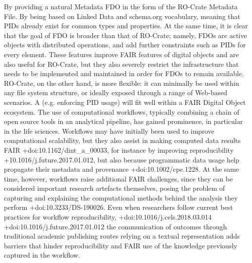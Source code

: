 By providing a natural Metadata FDO in the form of the RO-Crate Metadata File.\markdownRendererOlItemEnd 
{}By being based on Linked Data and schema.org vocabulary, meaning that PIDs already exist for common types and properties.\markdownRendererOlItemEnd 
\markdownRendererOlEndTight \markdownRendererInterblockSeparator
{}At the same time, it is clear that the goal of FDO is broader than that of RO-Crate; namely, FDOs are active objects with distributed operations, and add further constraints such as PIDs for every element. These features improve FAIR features of digital objects and are also useful for RO-Crate, but they also severely restrict the infrastructure that needs to be implemented and maintained in order for FDOs to remain available. RO-Crate, on the other hand, is more flexible: it can minimally be used within any file system structure, or ideally exposed through a range of Web-based scenarios. A  (e.g. enforcing PID usage) will fit well within a FAIR Digital Object ecosystem.\markdownRendererInterblockSeparator
{}\markdownRendererInterblockSeparator
{}The use of computational workflows, typically combining a chain of open source tools in an analytical pipeline, has gained prominence, in particular in the life sciences. Workflows may have initially been used to improve computational scalability, but they also assist in making computed data results FAIR +{}{}{doi:10.1162/dint_a_00033}, for instance by improving reproducibility +{}{}{10.1016/j.future.2017.01.012}, but also because programmatic data usage help propagate their metadata and provenance +{}{}{doi:10.1002/cpe.1228}. At the same time, however, workflows raise additional FAIR challenges, since they can be considered important research artefacts themselves, posing the problem of capturing and explaining the computational methods behind the analysis they perform +{}{}{doi:10.3233/DS-190026}.\markdownRendererInterblockSeparator
{}Even when researchers follow current best practices for workflow reproducibility, +{}{}{doi:10.1016/j.cels.2018.03.014} +{}{}{doi:10.1016/j.future.2017.01.012} the communication of outcomes through traditional academic publishing routes relying on a textual representation adds barriers that hinder reproducibility and FAIR use of the knowledge previously captured in the workflow.\markdownRendererInterblockSeparator
